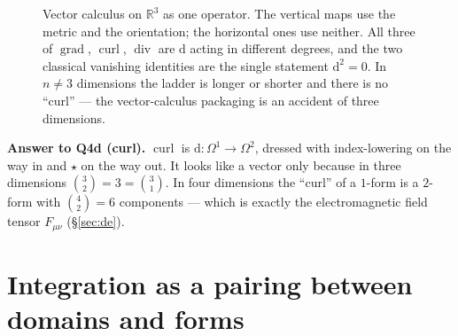 \documentclass[10pt,a4paper]{article}
\newcommand{\dd}{\mathrm{d}}
\newcommand{\R}{\mathbb{R}}
\newcommand{\Om}{\Omega}
\newcommand{\A}{\mathbf{A}}
\newcommand{\B}{\mathbf{B}}
\DeclareMathOperator{\grad}{grad}
\DeclareMathOperator{\curl}{curl}
\DeclareMathOperator{\dive}{div}
\theoremstyle{plain}
\theoremstyle{definition}
\numberwithin{equation}{section}
\begin{document}
\begin{figure}[h]
\centering
{}
\caption{Vector calculus on $\R^3$ as one operator. The vertical maps use the
metric and the orientation; the horizontal ones use neither. All three of $\grad$, $\curl$,
$\dive$ are $\dd$ acting in different degrees, and the two classical vanishing identities are
the single statement $\dd^2=0$. In $n\ne3$ dimensions the ladder is longer or shorter and there
is no ``curl'' --- the vector-calculus packaging is an accident of three dimensions.}
\label{fig:ladder}
\end{figure}

\begin{keybox}
\textbf{Answer to Q4d (curl).} $\curl$ is $\dd:\Om^1\to\Om^2$, dressed with index-lowering on
the way in and $\star$ on the way out. It looks like a vector only because in three dimensions
$\binom32=3=\binom31$. In four dimensions the ``curl'' of a $1$-form is a $2$-form with
$\binom42=6$ components --- which is exactly the electromagnetic field tensor $F_{\mu\nu}$
(\S\ref{sec:de}).
\end{keybox}


\section{Integration as a pairing between domains and forms}
\label{sec:integration}
\end{document}
